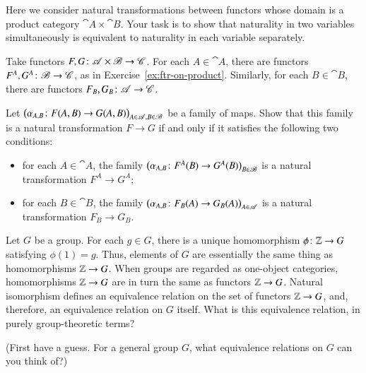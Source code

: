 \begin{question}
\label{ex:nat-iso-on-product}
Here we consider natural transformations between functors whose domain
is a product%
%
%
category $\cat{A} \times \cat{B}$.  Your task is to show that naturality in
two variables simultaneously is equivalent to naturality in each variable
separately.

Take functors $F, G\from \cat{A} \times \cat{B} \to \cat{C}$.  For each $A
\in \cat{A}$, there are functors $F^A, G^A\from \cat{B} \to \cat{C}$, as in
Exercise~\ref{ex:ftr-on-product}.  Similarly, for each $B\in\cat{B}$,
there are functors $F_B, G_B\from \cat{A} \to \cat{C}$.

Let $\bigl(\alpha_{A, B}\from F(A, B) \to G(A, B)\bigr)_{A \in \cat{A}, B
  \in \cat{B}}$ be a family of maps.  Show that this family is a natural
transformation $F \to G$ if and only if it satisfies the following two
conditions:
%
\begin{itemize}
\item
for each $A \in \cat{A}$, the family $\bigl(\alpha_{A, B}\from F^A(B) \to
G^A(B)\bigr)_{B \in \cat{B}}$ is a natural transformation $F^A \to G^A$;

\item
for each $B \in \cat{B}$, the family $\bigl(\alpha_{A, B}\from F_B(A) \to
G_B(A)\bigr)_{A \in \cat{A}}$ is a natural transformation $F_B \to G_B$.
\end{itemize}
\end{question}


\begin{question}
Let $G$ be a group.%
%
%
For each $g \in G$, there is a unique homomorphism
$\phi\from \integers \to G$%
%
%
satisfying $\phi(1) = g$.  Thus, elements of $G$ are essentially the same
thing as homomorphisms $\mathbb{Z} \to G$.  When groups are regarded as
one-object categories, homomorphisms $\mathbb{Z} \to G$ are in turn the same
as functors $\mathbb{Z} \to G$.  Natural isomorphism defines an equivalence
relation on the set of functors $\mathbb{Z} \to G$, and, therefore, an
equivalence relation on $G$ itself.  What is this equivalence relation, in
purely group-theoretic terms?

(First have a guess.  For a general group $G$, what equivalence
relations on $G$ can you think of?)
\end{question}


